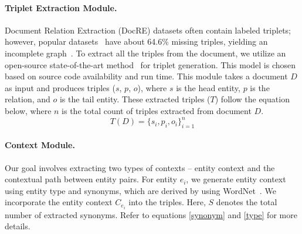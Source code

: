 \documentclass[letterpaper]{article} %
\begin{document}
\paragraph{
\textbf{Triplet Extraction Module.}} Document Relation Extraction (DocRE) datasets often contain labeled triplets; however, popular datasets~\cite{yao-etal-2019-docred} have about 64.6\% missing triples, yielding an incomplete graph~\cite{DBLP:conf/emnlp/Tan0BNA22}. To extract all the triples from the  document, we utilize an open-source state-of-the-art method~\cite{huguet-cabot-navigli-2021-rebel-relation} for triplet generation. This model is chosen based on source code availability and run time. This module takes a document $D$ as input and produces triples ($s$, $p$, $o$), where $s$ is the head entity, $p$ is the relation, and $o$ is the tail entity. These extracted triples ($T$) follow the equation below, where $n$ is the total count of triples extracted from document $D$.
\begin{equation}\label{eq3}
    T(D)=\{s_i,p_i,o_i\}_{i=1}^n
\end{equation}

\paragraph{\textbf{Context Module.}} Our goal involves extracting two types of contexts -- entity context and the contextual path between entity pairs. For entity $e_i$, we generate entity context using entity type and synonyms, which are derived by using WordNet~\cite{10.1145/219717.219748}.
We incorporate the entity context $C_{e_i}$ into the triples. Here, $S$ denotes the total number of extracted synonyms. Refer to equations \ref{synonym} and \ref{type} for more details.
\end{document}
